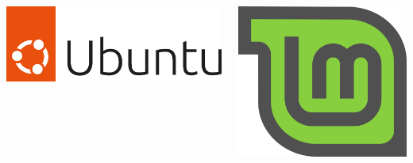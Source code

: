 \begin{frame}
	\vfill
	
	\begin{columns}
		\begin{column}{.5\linewidth}
			\centering\includegraphics[height=3\baselineskip]{../graphics/logos/Ubuntu/ubuntu-logo-2022.png}
		\end{column}
		\hfill
		\begin{column}{.5\linewidth}
			\centering\includegraphics[height=3\baselineskip]{../graphics/logos/Mint/leaf.png}
		\end{column}
	\end{columns}
\end{frame}
